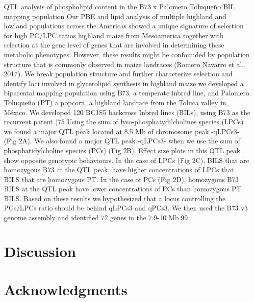 \documentclass[9pt,twocolumn,twoside,lineno]{gsajnl}
\begin{document}
QTL analysis of phospholipid content in the B73 x Palomero Toluqueño BIL mapping population
Our PBE and lipid analysis of multiple highland and lowland populations across the Americas showed a unique signature of selection for high PC/LPC ratios highland maize from Mesoamerica together with selection at the gene level of genes that are involved in determining these metabolic phenotypes. However, these results might be confounded by population structure that is commonly observed in maize landraces (Romero Navarro et al., 2017). We break population structure and further characterize selection and identify loci involved in glycerolipid synthesis in highland maize we developed a biparental mapping population using B73, a temperate inbred line, and Palomero Toluqueño (PT) a popcorn, a highland landrace from the Toluca valley in México. We developed 120 BC1S5 backcross Inbred  lines (BILs), using B73 as the recurrent parent (75%
Using the sum of lyso-phosphatydilcholines species (LPCs) we found a major QTL peak located at 8.5 Mb of chromosome peak -qLPCs3- (Fig 2A). We also found a major QTL peak -qLPCs3- when we use the sum of phosphatidylcholine species (PCs) (Fig 2B). Effect size plots in this QTL peak show opposite genotypic behaviours. In the case of LPCs (Fig 2C), BILS that are homozygous B73 at the QTL peak, have higher concentrations of LPCs that BILS that are homozygous PT. In the case of PCs (Fig 2D), homozygous B73 BILS at the QTL peak have lower concentrations of PCs than homozygous PT BILS. Based on these results we hypothesized that a locus controlling the PCs/LPCs ratio should be behind  qLPCs3 and qPCs3. We then used the B73 v3 genome assembly and identified 72 genes in the 7.9-10 Mb 99%

\section{Discussion}
\label{sec:discusion}

\section{Acknowledgments}
\label{sec:acknowledgments}


\end{document}

